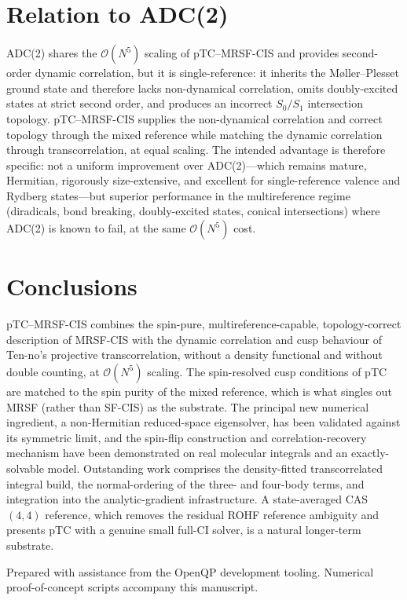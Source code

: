 \documentclass[aps,prb,reprint,superscriptaddress,floatfix]{revtex4-2}
\begin{document}
\section{Relation to ADC(2)}

ADC(2) shares the $\mathcal{O}(N^5)$ scaling of pTC--MRSF-CIS and provides
second-order dynamic correlation, but it is single-reference: it inherits the
M{\o}ller--Plesset ground state and therefore lacks non-dynamical correlation,
omits doubly-excited states at strict second order, and produces an incorrect
$S_0/S_1$ intersection topology. pTC--MRSF-CIS supplies the non-dynamical
correlation and correct topology through the mixed reference while matching the
dynamic correlation through transcorrelation, at equal scaling. The intended
advantage is therefore specific: not a uniform improvement over ADC(2)---which
remains mature, Hermitian, rigorously size-extensive, and excellent for
single-reference valence and Rydberg states---but superior performance in the
multireference regime (diradicals, bond breaking, doubly-excited states, conical
intersections) where ADC(2) is known to fail, at the same $\mathcal{O}(N^5)$ cost.

\section{Conclusions}

pTC--MRSF-CIS combines the spin-pure, multireference-capable, topology-correct
description of MRSF-CIS with the dynamic correlation and cusp behaviour of Ten-no's
projective transcorrelation, without a density functional and without double
counting, at $\mathcal{O}(N^5)$ scaling. The spin-resolved cusp conditions of pTC
are matched to the spin purity of the mixed reference, which is what singles out
MRSF (rather than SF-CIS) as the substrate. The principal new numerical ingredient,
a non-Hermitian reduced-space eigensolver, has been validated against its
symmetric limit, and the spin-flip construction and correlation-recovery mechanism
have been demonstrated on real molecular integrals and an exactly-solvable model.
Outstanding work comprises the density-fitted transcorrelated integral build, the
normal-ordering of the three- and four-body terms, and integration into the
analytic-gradient infrastructure. A state-averaged CAS$(4,4)$ reference, which
removes the residual ROHF reference ambiguity and presents pTC with a genuine
small full-CI solver, is a natural longer-term substrate.

\begin{acknowledgments}
Prepared with assistance from the OpenQP development tooling. Numerical
proof-of-concept scripts accompany this manuscript.
\end{acknowledgments}
\end{document}
